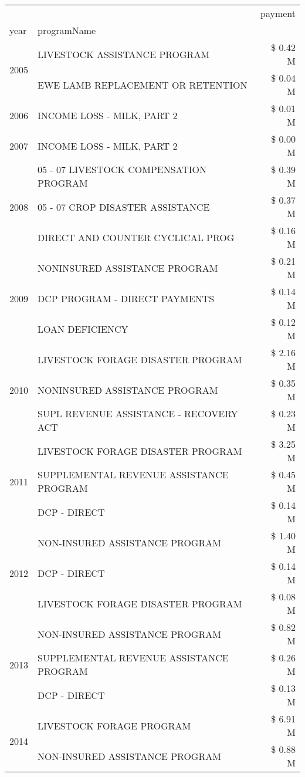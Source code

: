 \begin{tabular}{llr}
\toprule
 &  & payment \\
year & programName &  \\
\midrule
\multirow[t]{2}{*}{2005} & LIVESTOCK ASSISTANCE PROGRAM & \$ 0.42 M \\
 & EWE LAMB REPLACEMENT OR RETENTION & \$ 0.04 M \\
\cline{1-3}
2006 & INCOME LOSS - MILK, PART 2 & \$ 0.01 M \\
\cline{1-3}
2007 & INCOME LOSS - MILK, PART 2 & \$ 0.00 M \\
\cline{1-3}
\multirow[t]{3}{*}{2008} & 05 - 07 LIVESTOCK COMPENSATION PROGRAM & \$ 0.39 M \\
 & 05 - 07 CROP DISASTER ASSISTANCE & \$ 0.37 M \\
 & DIRECT AND COUNTER CYCLICAL PROG & \$ 0.16 M \\
\cline{1-3}
\multirow[t]{3}{*}{2009} & NONINSURED ASSISTANCE PROGRAM & \$ 0.21 M \\
 & DCP PROGRAM - DIRECT PAYMENTS & \$ 0.14 M \\
 & LOAN DEFICIENCY & \$ 0.12 M \\
\cline{1-3}
\multirow[t]{3}{*}{2010} & LIVESTOCK FORAGE DISASTER PROGRAM & \$ 2.16 M \\
 & NONINSURED ASSISTANCE PROGRAM & \$ 0.35 M \\
 & SUPL REVENUE ASSISTANCE - RECOVERY ACT & \$ 0.23 M \\
\cline{1-3}
\multirow[t]{3}{*}{2011} & LIVESTOCK FORAGE DISASTER PROGRAM & \$ 3.25 M \\
 & SUPPLEMENTAL REVENUE ASSISTANCE PROGRAM & \$ 0.45 M \\
 & DCP - DIRECT & \$ 0.14 M \\
\cline{1-3}
\multirow[t]{3}{*}{2012} & NON-INSURED ASSISTANCE PROGRAM & \$ 1.40 M \\
 & DCP - DIRECT & \$ 0.14 M \\
 & LIVESTOCK FORAGE DISASTER PROGRAM & \$ 0.08 M \\
\cline{1-3}
\multirow[t]{3}{*}{2013} & NON-INSURED ASSISTANCE PROGRAM & \$ 0.82 M \\
 & SUPPLEMENTAL REVENUE ASSISTANCE PROGRAM & \$ 0.26 M \\
 & DCP - DIRECT & \$ 0.13 M \\
\cline{1-3}
\multirow[t]{3}{*}{2014} & LIVESTOCK FORAGE PROGRAM & \$ 6.91 M \\
 & NON-INSURED ASSISTANCE PROGRAM & \$ 0.88 M \\

\end{tabular}

